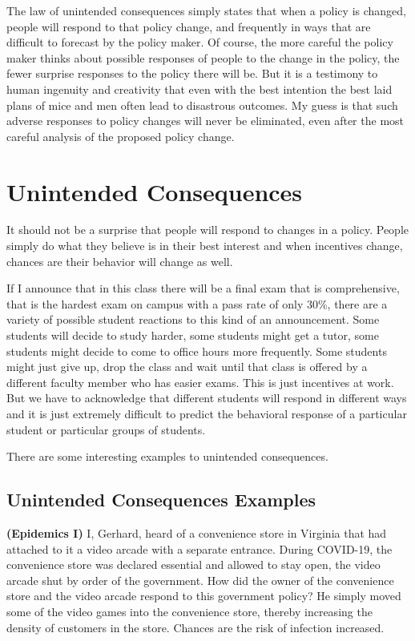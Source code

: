 \documentclass[
]{book}
\begin{document}
The law of unintended consequences simply states that when a policy is changed, people will respond to that policy change, and frequently in ways that are difficult to forecast by the policy maker. Of course, the more careful the policy maker thinks about possible responses of people to the change in the policy, the fewer surprise responses to the policy there will be. But it is a testimony to human ingenuity and creativity that even with the best intention the best laid plans of mice and men often lead to disastrous outcomes. My guess is that such adverse responses to policy changes will never be eliminated, even after the most careful analysis of the proposed policy change.

\hypertarget{unintended-consequences}{%
\section{Unintended Consequences}\label{unintended-consequences}}

It should not be a surprise that people will respond to changes in a policy. People simply do what they believe is in their best interest and when incentives change, chances are their behavior will change as well.

If I announce that in this class there will be a final exam that is comprehensive, that is the hardest exam on campus with a pass rate of only 30\%, there are a variety of possible student reactions to this kind of an announcement. Some students will decide to study harder, some students might get a tutor, some students might decide to come to office hours more frequently. Some students might just give up, drop the class and wait until that class is offered by a different faculty member who has easier exams. This is just incentives at work. But we have to acknowledge that different students will respond in different ways and it is just extremely difficult to predict the behavioral response of a particular student or particular groups of students.

There are some interesting examples to unintended consequences.

\hypertarget{unintended-consequences-examples}{%
\subsection{Unintended Consequences Examples}\label{unintended-consequences-examples}}

\textbf{(Epidemics I)} I, Gerhard, heard of a convenience store in Virginia that had attached to it a video arcade with a separate entrance. During COVID-19, the convenience store was declared essential and allowed to stay open, the video arcade shut by order of the government. How did the owner of the convenience store and the video arcade respond to this government policy? He simply moved some of the video games into the convenience store, thereby increasing the density of customers in the store. Chances are the risk of infection increased.
\end{document}
